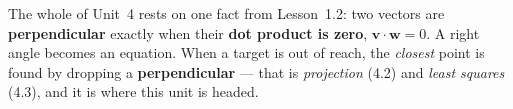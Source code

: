 \documentclass[10pt]{article}
\begin{document}
\vspace{0.10in}

\begin{remindbox}
\small The whole of Unit~4 rests on one fact from Lesson~1.2: two vectors are
\textbf{perpendicular} exactly when their \textbf{dot product is zero},
$\mathbf v\cdot\mathbf w=0$. A right angle becomes an equation. When a target is out of reach, the
\emph{closest} point is found by dropping a \textbf{perpendicular} --- that is
\emph{projection} (4.2) and \emph{least squares} (4.3), and it is where this unit is headed.
\end{remindbox}
\end{document}
